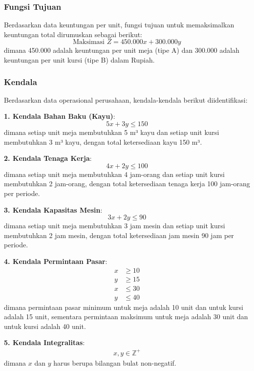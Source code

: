 \documentclass[twocolumn]{article}
\begin{document}
\subsubsection{Fungsi Tujuan}
Berdasarkan data keuntungan per unit, fungsi tujuan untuk memaksimalkan keuntungan total dirumuskan sebagai berikut:
\begin{equation}
\text{Maksimasi } Z = 450.000x + 300.000y
\end{equation}
dimana 450.000 adalah keuntungan per unit meja (tipe A) dan 300.000 adalah keuntungan per unit kursi (tipe B) dalam Rupiah.

\subsubsection{Kendala}
Berdasarkan data operasional perusahaan, kendala-kendala berikut diidentifikasi:

\textbf{1. Kendala Bahan Baku (Kayu)}:
\begin{equation}
5x + 3y \leq 150
\end{equation}
dimana setiap unit meja membutuhkan 5 m³ kayu dan setiap unit kursi membutuhkan 3 m³ kayu, dengan total ketersediaan kayu 150 m³.

\textbf{2. Kendala Tenaga Kerja}:
\begin{equation}
4x + 2y \leq 100
\end{equation}
dimana setiap unit meja membutuhkan 4 jam-orang dan setiap unit kursi membutuhkan 2 jam-orang, dengan total ketersediaan tenaga kerja 100 jam-orang per periode.

\textbf{3. Kendala Kapasitas Mesin}:
\begin{equation}
3x + 2y \leq 90
\end{equation}
dimana setiap unit meja membutuhkan 3 jam mesin dan setiap unit kursi membutuhkan 2 jam mesin, dengan total ketersediaan jam mesin 90 jam per periode.

\textbf{4. Kendala Permintaan Pasar}:
\begin{align}
x &\geq 10 \\
y &\geq 15 \\
x &\leq 30 \\
y &\leq 40
\end{align}
dimana permintaan pasar minimum untuk meja adalah 10 unit dan untuk kursi adalah 15 unit, sementara permintaan maksimum untuk meja adalah 30 unit dan untuk kursi adalah 40 unit.

\textbf{5. Kendala Integralitas}:
\begin{align}
x, y \in \mathbb{Z}^+
\end{align}
dimana $x$ dan $y$ harus berupa bilangan bulat non-negatif.
\end{document}
